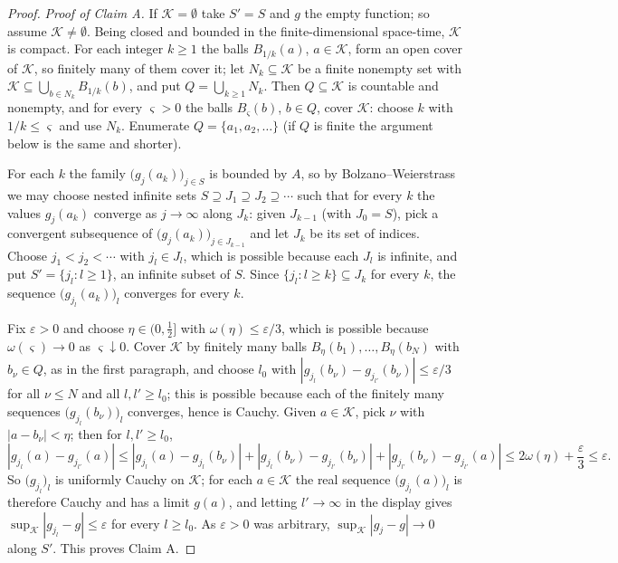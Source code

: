 \begin{proof}
\emph{Proof of Claim A.} If $\mathcal K=\emptyset$ take $S'=S$ and $g$ the empty
function; so assume $\mathcal K\ne\emptyset$. Being closed and bounded in the
finite-dimensional space-time, $\mathcal K$ is compact. For each integer $k\ge1$
the balls $B_{1/k}(a)$, $a\in\mathcal K$, form an open cover of $\mathcal K$, so
finitely many of them cover it; let $N_k\subseteq\mathcal K$ be a finite
nonempty set with $\mathcal K\subseteq\bigcup_{b\in N_k}B_{1/k}(b)$, and put
$Q=\bigcup_{k\ge1}N_k$. Then $Q\subseteq\mathcal K$ is countable and nonempty,
and for every $\varsigma>0$ the balls $B_\varsigma(b)$, $b\in Q$, cover
$\mathcal K$: choose $k$ with $1/k\le\varsigma$ and use $N_k$. Enumerate
$Q=\{a_1,a_2,\dots\}$ (if $Q$ is finite the argument below is the same and
shorter).

For each $k$ the family $\bigl(g_j(a_k)\bigr)_{j\in S}$ is bounded by $A$, so by
Bolzano--Weierstrass we may choose nested infinite sets
$S\supseteq J_1\supseteq J_2\supseteq\cdots$ such that for every $k$ the values
$g_j(a_k)$ converge as $j\to\infty$ along $J_k$: given $J_{k-1}$ (with
$J_0=S$), pick a convergent subsequence of $\bigl(g_j(a_k)\bigr)_{j\in J_{k-1}}$
and let $J_k$ be its set of indices. Choose $j_1<j_2<\cdots$ with $j_l\in J_l$,
which is possible because each $J_l$ is infinite, and put $S'=\{j_l:l\ge1\}$, an
infinite subset of $S$. Since $\{j_l:l\ge k\}\subseteq J_k$ for every $k$, the
sequence $\bigl(g_{j_l}(a_k)\bigr)_l$ converges for every $k$.

Fix $\varepsilon>0$ and choose $\eta\in(0,\tfrac12]$ with
$\omega(\eta)\le\varepsilon/3$, which is possible because
$\omega(\varsigma)\to0$ as $\varsigma\downarrow0$. Cover $\mathcal K$ by
finitely many balls $B_\eta(b_1),\dots,B_\eta(b_N)$ with $b_\nu\in Q$, as in the
first paragraph, and choose $l_0$ with
$|g_{j_l}(b_\nu)-g_{j_{l'}}(b_\nu)|\le\varepsilon/3$ for all $\nu\le N$ and all
$l,l'\ge l_0$; this is possible because each of the finitely many sequences
$\bigl(g_{j_l}(b_\nu)\bigr)_l$ converges, hence is Cauchy. Given
$a\in\mathcal K$, pick $\nu$ with $|a-b_\nu|<\eta$; then for $l,l'\ge l_0$,
\[
  |g_{j_l}(a)-g_{j_{l'}}(a)|
   \le|g_{j_l}(a)-g_{j_l}(b_\nu)|
     +|g_{j_l}(b_\nu)-g_{j_{l'}}(b_\nu)|
     +|g_{j_{l'}}(b_\nu)-g_{j_{l'}}(a)|
   \le2\omega(\eta)+\frac\varepsilon3\le\varepsilon .
\]
So $\bigl(g_{j_l}\bigr)_l$ is uniformly Cauchy on $\mathcal K$; for each
$a\in\mathcal K$ the real sequence $\bigl(g_{j_l}(a)\bigr)_l$ is therefore
Cauchy and has a limit $g(a)$, and letting $l'\to\infty$ in the display gives
$\sup_{\mathcal K}|g_{j_l}-g|\le\varepsilon$ for every $l\ge l_0$. As
$\varepsilon>0$ was arbitrary, $\sup_{\mathcal K}|g_j-g|\to0$ along $S'$. This
proves Claim A.


\end{proof}
